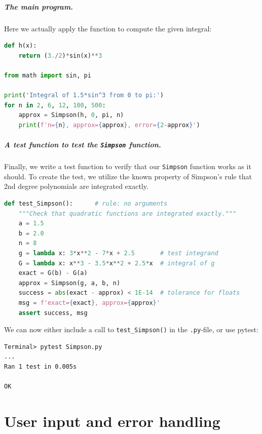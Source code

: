 \documentclass[graybox,envcountchap,sectrefs,final]{svmonodo}
\begin{document}
\paragraph{The main program.}
Here we actually apply the function to compute the given integral:
\begin{lstlisting}[language=Python,style=blue1]
def h(x):
    return (3./2)*sin(x)**3

from math import sin, pi

print('Integral of 1.5*sin^3 from 0 to pi:')
for n in 2, 6, 12, 100, 500:
    approx = Simpson(h, 0, pi, n)
    print(f'n={n}, approx={approx}, error={2-approx}')
\end{lstlisting}


\paragraph{A test function to test the \texttt{Simpson} function.}
Finally, we write a test function to verify that our \texttt{Simpson} function works as it should. To create the test, we
utilize the known property of Simpson's rule that 2nd degree polynomials are integrated exactly.

\begin{lstlisting}[language=Python,style=blue1]
def test_Simpson():      # rule: no arguments
    """Check that quadratic functions are integrated exactly."""
    a = 1.5
    b = 2.0
    n = 8
    g = lambda x: 3*x**2 - 7*x + 2.5       # test integrand
    G = lambda x: x**3 - 3.5*x**2 + 2.5*x  # integral of g
    exact = G(b) - G(a)
    approx = Simpson(g, a, b, n)
    success = abs(exact - approx) < 1E-14  # tolerance for floats
    msg = f'exact={exact}, approx={approx}'
    assert success, msg
\end{lstlisting}
We can now either include a call to \Verb!test_Simpson()! in the \texttt{.py}-file, or use pytest:

\begin{Verbatim}[frame=lines,label=\fbox{{\tiny Terminal}},framesep=2.5mm,framerule=0.7pt]
Terminal> pytest Simpson.py
...
Ran 1 test in 0.005s

OK
\end{Verbatim}

\chapter{User input and error handling}
\label{ch:input}
\end{document}
